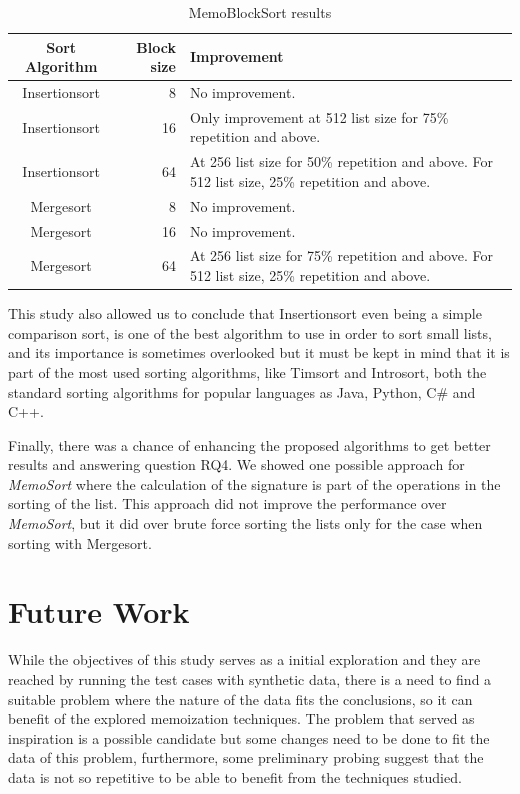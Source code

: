 \documentclass[a4paper,12pt]{article}
\begin{document}
\begin{table}[H]
\centering
\begin{tabular}{|c|r|p{80mm}|}  \hline
	{Sort Algorithm} & {Block size} & {Improvement} \\  \hline
	Insertionsort & 8 & No improvement. \\ 
	Insertionsort & 16 & Only improvement at 512 list size for 75\% repetition and above. \\ 
	Insertionsort & 64 & At  256 list size for 50\% repetition and above. For 512 list size, 25\% repetition and above.\\ 
	Mergesort & 8 &  No improvement. \\ 
	Mergesort & 16 & No improvement. \\ 
	Mergesort & 64 & At  256 list size for 75\% repetition and above. For 512 list size, 25\% repetition and above. \\  \hline
\end{tabular}
\caption{MemoBlockSort results}
\label{fig:MemoBlockSortResults}
\end{table}

This study also allowed us to conclude that Insertionsort even being a simple comparison sort, is one of the best algorithm to use in order to sort small lists, and its importance is sometimes overlooked but it must be kept in mind that it is part of the most used sorting algorithms, like Timsort and Introsort, both the standard sorting algorithms for popular languages as Java, Python, C\# and C++.

Finally, there was a chance of enhancing the proposed algorithms to get better results and answering question RQ4. We showed one possible approach for  {\it MemoSort} where the calculation of the signature is part of the operations in the sorting of the list. This approach did not improve the performance over {\it MemoSort}, but it did over brute force sorting the lists only for the case when sorting with Mergesort. \\

\section{Future Work}

While the objectives of this study serves as a initial exploration and they are reached by running the test cases with synthetic data, there is a need to find a suitable problem where the nature of the data fits the conclusions, so it can benefit of  the explored memoization techniques. The problem that served as inspiration \cite{Arch2015} is a possible candidate but some changes need to be done to fit the data of this problem, furthermore, some preliminary probing suggest that the data is not so repetitive to be able to benefit from the techniques studied.
\end{document}
